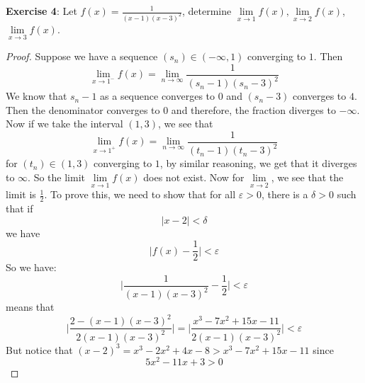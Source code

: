 \documentclass{article}
\begin{document}
\textbf{Exercise 4}: Let $f(x) = \frac{1}{(x - 1)(x - 3)^{2}}$, determine $\lim\limits_{x \to 1}f(x), \lim\limits_{x \to 2}f(x)$, $\lim\limits_{x \to 3}f(x)$.
    \begin{proof}
        Suppose we have a sequence $(s_{n}) \in (-\infty, 1)$ converging to $1$. Then 
            \begin{equation*}
                \lim\limits_{x \to 1^{-}}f(x) = \lim\limits_{n \to \infty}\dfrac{1}{(s_{n} - 1)(s_{n} - 3)^{2}}
            \end{equation*}
        We know that $s_{n} - 1$ as a sequence converges to $0$ and $(s_{n} - 3)$ converges to $4$. Then the denominator converges to $0$ and therefore, the fraction diverges to $-\infty$. Now if we take the interval $(1, 3)$, we see that
            \begin{equation*}
                \lim\limits_{x \to 1^{+}}f(x) = \lim\limits_{n \to \infty}\dfrac{1}{(t_{n} - 1)(t_{n} - 3)^{2}}
            \end{equation*}
        for $(t_{n}) \in (1, 3)$ converging to $1$, by similar reasoning, we get that it diverges to $\infty$. So the limit $\lim\limits_{x \to 1}f(x)$ does not exist. Now for $\lim\limits_{x \to 2}$, we see that the limit is $\frac{1}{2}$. To prove this, we need to show that for all $\varepsilon> 0$, there is a $\delta> 0$ such that if
            \begin{equation*}
                \lvert x - 2 \rvert< \delta
            \end{equation*}
        we have
            \begin{equation*}
                \lvert f(x) - \dfrac{1}{2} \rvert< \varepsilon
            \end{equation*} 
        So we have:
            \begin{equation*}
                \lvert \dfrac{1}{(x - 1)(x - 3)^{2}} - \dfrac{1}{2} \rvert< \varepsilon
            \end{equation*}
        means that
            \begin{equation*}
                \lvert \dfrac{2 - (x - 1)(x - 3)^{2}}{2(x - 1)(x - 3)^{2}} \rvert = \lvert \dfrac{x^{3} - 7x^{2} + 15x - 11}{2(x - 1)(x - 3)^{2}} \rvert< \varepsilon
            \end{equation*}
        But notice that $(x - 2)^{3} = x^{3} -2x^{2} + 4x - 8 > x^{3} - 7x^{2} + 15x - 11$ since
            \begin{equation*}
                5x^{2}  - 11x + 3 > 0
            \end{equation*}

\end{proof}
\end{document}
